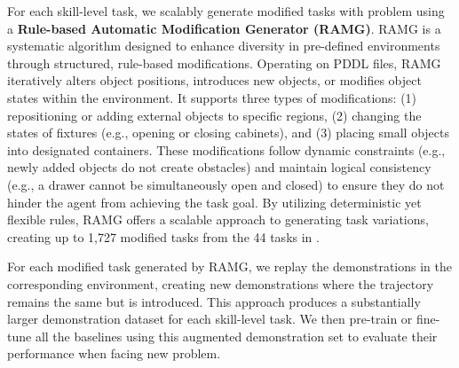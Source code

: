 For each skill-level task, we scalably generate modified tasks with \pb problem using a \textbf{Rule-based Automatic Modification Generator (RAMG)}. RAMG is a systematic algorithm designed to enhance diversity in pre-defined environments through structured, rule-based modifications. Operating on PDDL files, RAMG iteratively alters object positions, introduces new objects, or modifies object states within the environment. It supports three types of modifications: (1) repositioning or adding external objects to specific regions, (2) changing the states of fixtures (e.g., opening or closing cabinets), and (3) placing small objects into designated containers. These modifications follow dynamic constraints (e.g., newly added objects do not create obstacles) and maintain logical consistency (e.g., a drawer cannot be simultaneously open and closed) to ensure they do not hinder the agent from achieving the task goal. By utilizing deterministic yet flexible rules, RAMG offers a scalable approach to generating task variations, creating up to 1,727 modified tasks from the 44 tasks in \taskoriginal.

For each modified task generated by RAMG, we replay the demonstrations in the corresponding environment, creating new demonstrations where the trajectory remains the same but \pb is introduced. This approach produces a substantially larger demonstration dataset for each skill-level task. We then pre-train or fine-tune all the baselines using this augmented demonstration set to evaluate their performance when facing new \pb problem.

